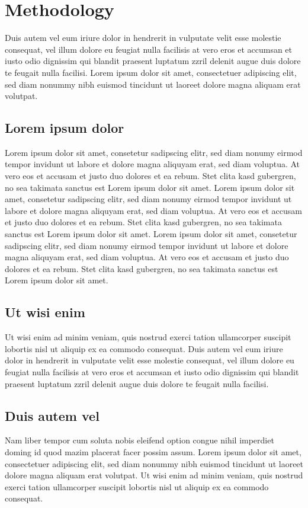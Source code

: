 
\chapter{Methodology}

Duis autem vel eum iriure dolor in hendrerit in vulputate velit esse molestie consequat, vel illum dolore eu feugiat nulla facilisis at vero eros et accumsan et iusto odio dignissim qui blandit praesent luptatum zzril delenit augue duis dolore te feugait nulla facilisi. Lorem ipsum dolor sit amet, consectetuer adipiscing elit, sed diam nonummy nibh euismod tincidunt ut laoreet dolore magna aliquam erat volutpat.

\section{Lorem ipsum dolor}
Lorem ipsum dolor sit amet, consetetur sadipscing elitr, sed diam nonumy eirmod tempor invidunt ut labore et dolore magna aliquyam erat, sed diam voluptua. At vero eos et accusam et justo duo dolores et ea rebum. Stet clita kasd gubergren, no sea takimata sanctus est Lorem ipsum dolor sit amet. Lorem ipsum dolor sit amet, consetetur sadipscing elitr, sed diam nonumy eirmod tempor invidunt ut labore et dolore magna aliquyam erat, sed diam voluptua. At vero eos et accusam et justo duo dolores et ea rebum. Stet clita kasd gubergren, no sea takimata sanctus est Lorem ipsum dolor sit amet. Lorem ipsum dolor sit amet, consetetur sadipscing elitr, sed diam nonumy eirmod tempor invidunt ut labore et dolore magna aliquyam erat, sed diam voluptua. At vero eos et accusam et justo duo dolores et ea rebum. Stet clita kasd gubergren, no sea takimata sanctus est Lorem ipsum dolor sit amet.

\section{Ut wisi enim}
Ut wisi enim ad minim veniam, quis nostrud exerci tation ullamcorper suscipit lobortis nisl ut aliquip ex ea commodo consequat. Duis autem vel eum iriure dolor in hendrerit in vulputate velit esse molestie consequat, vel illum dolore eu feugiat nulla facilisis at vero eros et accumsan et iusto odio dignissim qui blandit praesent luptatum zzril delenit augue duis dolore te feugait nulla facilisi.

\section{Duis autem vel}
Nam liber tempor cum soluta nobis eleifend option congue nihil imperdiet doming id quod mazim placerat facer possim assum. Lorem ipsum dolor sit amet, consectetuer adipiscing elit, sed diam nonummy nibh euismod tincidunt ut laoreet dolore magna aliquam erat volutpat. Ut wisi enim ad minim veniam, quis nostrud exerci tation ullamcorper suscipit lobortis nisl ut aliquip ex ea commodo consequat.